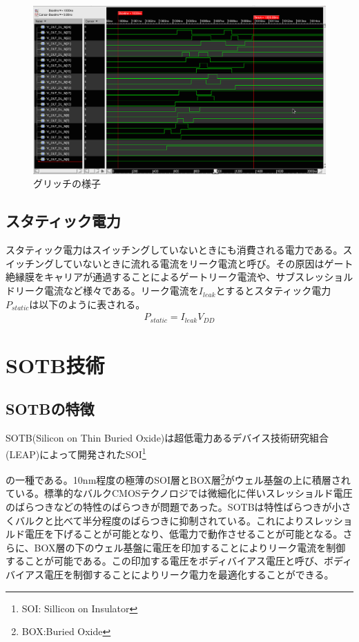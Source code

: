 {\begin{figure}[h]
\centering
\includegraphics[width=12cm]{./chap2/fig/glitch.eps}
\caption{グリッチの様子}
\label{fig:glitch}
\end{figure}

\subsection{スタティック電力}
\label{subsec:static_power}
スタティック電力はスイッチングしていないときにも消費される電力である。スイッチングしていないときに流れる電流をリーク電流と呼び。その原因はゲート絶縁膜をキャリアが通過することによるゲートリーク電流や、サブスレッショルドリーク電流など様々である。リーク電流を$I_{leak}$とするとスタティック電力$P_{static}$は以下のように表される。
\begin{eqnarray}
P_{static} = I_{leak}V_{DD}
\end{eqnarray}


\section{SOTB技術}
\label{sec:sotb}
\subsection{SOTBの特徴}
SOTB(Silicon on Thin Buried Oxide)は超低電力あるデバイス技術研究組合(LEAP)によって開発されたSOI\footnote{SOI: Sillicon on Insulator}
}の一種である。10nm程度の極薄のSOI層とBOX層\footnote{BOX:Buried Oxide}がウェル基盤の上に積層されている。標準的なバルクCMOSテクノロジでは微細化に伴いスレッショルド電圧のばらつきなどの特性のばらつきが問題であった。SOTBは特性ばらつきが小さくバルクと比べて半分程度のばらつきに抑制されている。\cite{sotb_variability}これによりスレッショルド電圧を下げることが可能となり、低電力で動作させることが可能となる。さらに、BOX層の下のウェル基盤に電圧を印加することによりリーク電流を制御することが可能である。この印加する電圧をボディバイアス電圧と呼び、ボディバイアス電圧を制御することによりリーク電力を最適化することができる。

